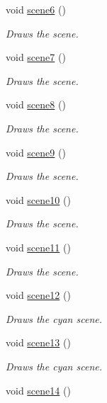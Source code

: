 \begin{DoxyCompactItemize}
void \hyperlink{classcutscene1_a2f30889d2d2d5126b99823bb81b167b3}{scene6} ()
\begin{DoxyCompactList}\small\item\em Draws the scene. \end{DoxyCompactList}\item 
void \hyperlink{classcutscene1_a5f5798e0f4ab664320f0f35aaa22b2a3}{scene7} ()
\begin{DoxyCompactList}\small\item\em Draws the scene. \end{DoxyCompactList}\item 
void \hyperlink{classcutscene1_a9f335e0ddd6112269bfd88a3b0cecdb5}{scene8} ()
\begin{DoxyCompactList}\small\item\em Draws the scene. \end{DoxyCompactList}\item 
void \hyperlink{classcutscene1_a5876edaf8fe041660e98c7aa8ca9c18b}{scene9} ()
\begin{DoxyCompactList}\small\item\em Draws the scene. \end{DoxyCompactList}\item 
void \hyperlink{classcutscene1_ad8352de19bf15b9b1104b76d4c278be8}{scene10} ()
\begin{DoxyCompactList}\small\item\em Draws the scene. \end{DoxyCompactList}\item 
void \hyperlink{classcutscene1_ac86b4ca661908ea43d5b672f3fc359c3}{scene11} ()
\begin{DoxyCompactList}\small\item\em Draws the scene. \end{DoxyCompactList}\item 
void \hyperlink{classcutscene1_a6c57956c7ec2eb301b2f093a1b3c9925}{scene12} ()
\begin{DoxyCompactList}\small\item\em Draws the cyan scene. \end{DoxyCompactList}\item 
void \hyperlink{classcutscene1_a70656ea0e35919324bff0a85f81a5a92}{scene13} ()
\begin{DoxyCompactList}\small\item\em Draws the cyan scene. \end{DoxyCompactList}\item 
void \hyperlink{classcutscene1_ad361d93d7c2c69c96bece8449221ac41}{scene14} ()

\end{DoxyCompactItemize}
